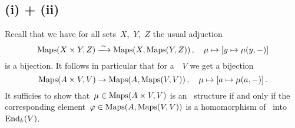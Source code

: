\section{}





\subsection*{(i) + (ii)}

Recall that we have for all sets~$X$,~$Y$,~$Z$ the usual adjuction
\[
  \Maps(X \times Y, Z)
  \xlongrightarrow{\sim}
  \Maps(X, \Maps(Y, Z)) \,,
  \quad
          \mu
  \mapsto [y \mapsto \mu(y,-)]
\]
is a bijection.
It follows in particular that for a~{\kvs}~$V$ we get a bijection
\[
          \operatorname{Maps}(A \times V, V)
  \to     \operatorname{Maps}(A, \operatorname{Maps}(V, V)) \,,
  \quad   \mu
  \mapsto [a \mapsto \mu(a,-)]  \,.
\]
It sufficies to show that~$\mu \in \operatorname{Maps}(A \times V, V)$ is an~{\Amod} structure if and only if the corresponding element~$\varphi \in \operatorname{Maps}(A, \operatorname{Maps}(V,V))$ is a homomorphism of~{\kalg} into~$\operatorname{End}_k(V)$.

